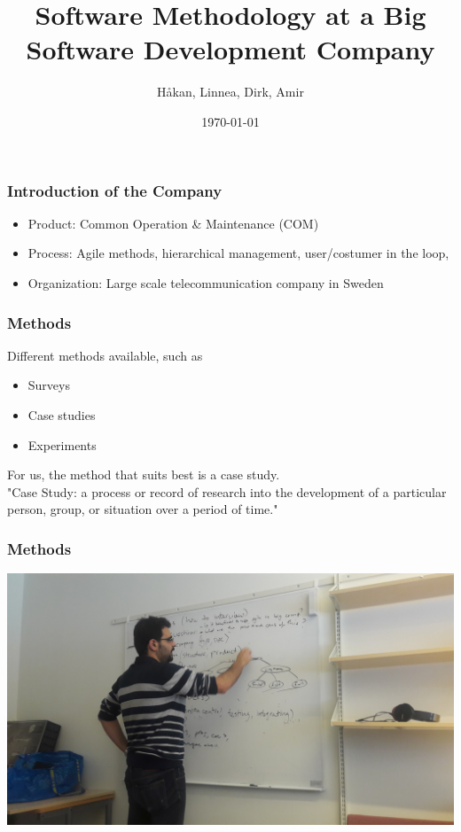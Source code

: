 \documentclass{beamer}
\begin{document}



\title{Software Methodology at a Big Software Development Company}
\author{H\aa kan, Linnea, Dirk, Amir}

\date{\today}

\begin{frame}
\titlepage
\end{frame}

\begin{frame}\frametitle{Introduction of the Company}
\begin{itemize}
\item Product: Common Operation \& Maintenance (COM)
\item Process: Agile methods, hierarchical management, user/costumer in the loop,  
\item Organization: Large scale telecommunication company in Sweden
\end{itemize}
\end{frame}

\begin{frame}
  \frametitle{Methods}
  Different methods available, such as
  \begin{itemize}
  \item Surveys
   \item Case studies
   \item Experiments
  \end{itemize}
  For us, the method that suits best is a case study.\\
  "Case Study: a process or record of research into the development of a particular person, group, or situation over a period of time."
\end{frame}

\begin{frame}
  \frametitle{Methods}
  \begin{center}
    \includegraphics[width=1\textwidth]{figs/amir.jpg}
  \end{center}
\end{frame}
\end{document}
